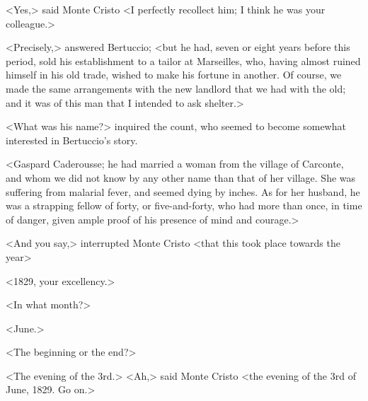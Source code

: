  <Yes,> said Monte Cristo <I perfectly recollect him; I think he was your colleague.> 

 <Precisely,> answered Bertuccio; <but he had, seven or eight years before this period, sold his establishment to a tailor at Marseilles, who, having almost ruined himself in his old trade, wished to make his fortune in another. Of course, we made the same arrangements with the new landlord that we had with the old; and it was of this man that I intended to ask shelter.> 

 <What was his name?> inquired the count, who seemed to become somewhat interested in Bertuccio's story. 

 <Gaspard Caderousse; he had married a woman from the village of Carconte, and whom we did not know by any other name than that of her village. She was suffering from malarial fever, and seemed dying by inches. As for her husband, he was a strapping fellow of forty, or five-and-forty, who had more than once, in time of danger, given ample proof of his presence of mind and courage.> 

 <And you say,> interrupted Monte Cristo <that this took place towards the year\longdash> 

 <1829, your excellency.> 

 <In what month?> 

 <June.> 

 <The beginning or the end?> 

 <The evening of the 3rd.>  <Ah,> said Monte Cristo <the evening of the 3rd of June, 1829. Go on.> 

